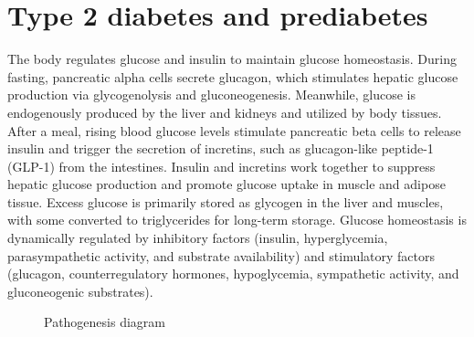 \documentclass[
  a4paper,
  headsepline=true,
  open=any]{scrbook}
\begin{document}
\hypertarget{type-2-diabetes-and-prediabetes}{%
\section{Type 2 diabetes and
prediabetes}\label{type-2-diabetes-and-prediabetes}}

The body regulates glucose and insulin to maintain glucose homeostasis.
During fasting, pancreatic alpha cells secrete glucagon, which
stimulates hepatic glucose production via glycogenolysis and
gluconeogenesis. Meanwhile, glucose is endogenously produced by the
liver and kidneys and utilized by body tissues. After a meal, rising
blood glucose levels stimulate pancreatic beta cells to release insulin
and trigger the secretion of incretins, such as glucagon-like peptide-1
(GLP-1) from the intestines. Insulin and incretins work together to
suppress hepatic glucose production and promote glucose uptake in muscle
and adipose tissue. Excess glucose is primarily stored as glycogen in
the liver and muscles, with some converted to triglycerides for
long-term storage. Glucose homeostasis is dynamically regulated by
inhibitory factors (insulin, hyperglycemia, parasympathetic activity,
and substrate availability) and stimulatory factors (glucagon,
counterregulatory hormones, hypoglycemia, sympathetic activity, and
gluconeogenic substrates).

\begin{figure}

\begin{minipage}[t]{\linewidth}

{\centering 


\caption{Pathogenesis diagram}

}

\end{minipage}%

\end{figure}
\end{document}
